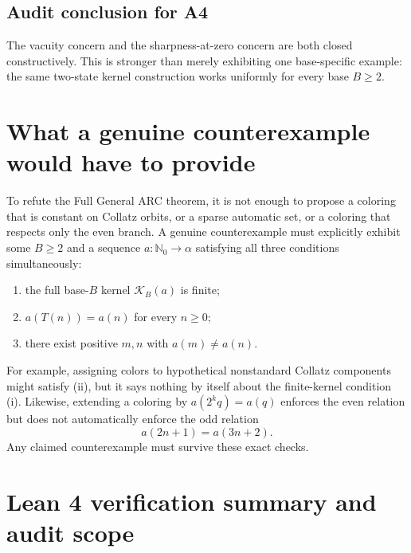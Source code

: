 \documentclass[11pt]{article}
\newcommand{\Nzero}{\mathbb{N}_0}
\newcommand{\K}{\mathcal{K}}
\begin{document}
\subsection{Audit conclusion for A4}

The vacuity concern and the sharpness-at-zero concern are both closed
constructively.  This is stronger than merely exhibiting one base-specific
example: the same two-state kernel construction works uniformly for every base
$B\ge2$.
\section{What a genuine counterexample would have to provide}

To refute the Full General ARC theorem, it is not enough to propose a coloring
that is constant on Collatz orbits, or a sparse automatic set, or a coloring
that respects only the even branch.  A genuine counterexample must explicitly
exhibit some $B\ge2$ and a sequence $a:\Nzero\to\alpha$ satisfying all three
conditions simultaneously:
\begin{enumerate}[label=(\roman*)]
\item the full base-$B$ kernel $\K_B(a)$ is finite;
\item $a(T(n))=a(n)$ for every $n\ge0$;
\item there exist positive $m,n$ with $a(m)\ne a(n)$.
\end{enumerate}
For example, assigning colors to hypothetical nonstandard Collatz components
might satisfy (ii), but it says nothing by itself about the finite-kernel
condition (i).  Likewise, extending a coloring by $a(2^kq)=a(q)$ enforces the
even relation but does not automatically enforce the odd relation
\[
a(2n+1)=a(3n+2).
\]
Any claimed counterexample must survive these exact checks.

\section{Lean 4 verification summary and audit scope}
\end{document}
